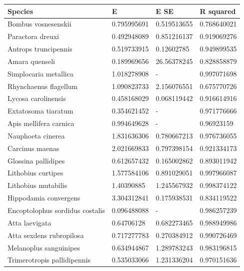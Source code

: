 \documentclass{article}
\begin{document}
\clearpage
\begin{table}[h]
\centering
 \footnotesize
 \begin{tabular}{llll}
Species                         & E           & E SE        & R squared   \\
 \hline\hline
Bombus vosnesenskii             & 0.795995691 & 0.519513655 & 0.768640021 \\
Paractora dreuxi                & 0.492948089 & 0.851216137 & 0.919069276 \\
Antrops truncipennis            & 0.519733915 & 0.12602785  & 0.949899535 \\
Amara quenseli                  & 0.189969656 & 26.56378245 & 0.828858879 \\
Simplocaria metallica           & 1.018278908 & -           & 0.997071698 \\
Rhynchaenus flagellum           & 1.090823733 & 2.156076551 & 0.675770726 \\
Lycosa carolinensis             & 0.458168029 & 0.068119442 & 0.916614916 \\
Extatosoma tiaratum             & 0.354621452 & -           & 0.971776666 \\
Apis mellifera carnica          & 0.994649628 & -           & 0.96923159  \\
Nauphoeta cinerea               & 1.831636306 & 0.780667213 & 0.976736055 \\
Carcinus maenas                 & 2.021669833 & 0.797398154 & 0.921334173 \\
Glossina pallidipes             & 0.612657432 & 0.165002862 & 0.893011942 \\
Lithobius curtipes              & 1.577584106 & 0.891029051 & 0.997966087 \\
Lithobius mutabilis             & 1.40390885  & 1.245567932 & 0.998374122 \\
Hippodamia convergens           & 3.304312841 & 0.175938531 & 0.834119522 \\
Encoptolophus sordidus costalis & 0.096488088 & -           & 0.986257239 \\
Atta laevigata                  & 0.64706128  & 0.682273465 & 0.988949986 \\
Atta sexdens rubropilosa        & 0.717277783 & 0.270384912 & 0.990726469 \\
Melanoplus sanguinipes          & 0.634944867 & 1.289783243 & 0.983196815 \\
Trimerotropis pallidipennis     & 0.535033066 & 1.231336204 & 0.970151636 \\

\end{tabular}
\end{table}
\end{document}
